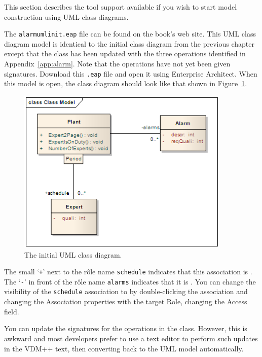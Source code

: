 This section describes the tool support available if you wish to start
model construction using UML class diagrams. 

The \texttt{alarmumlinit.eap} file can be found on the book's web
site. This UML class diagram model is identical to the initial class
diagram from the previous chapter 
except that the  class has been updated with the three
operations identified in Appendix~\ref{app:alarm}.
Note that the operations have not yet been given signatures. Download
this \texttt{.eap} file and open it using Enterprise Architect. When
this model is open, the class diagram should look like that shown in 
Figure~\ref{fig:initialuml}.

\begin{figure}[htbp]
\begin{center}
\includegraphics[width=4in]{figures/initialumloverture}
\caption{The initial UML class diagram.\label{fig:initialuml}}
\end{center}
\end{figure}

The small `\texttt{+}' next to the r\^{o}le name \texttt{schedule}
indicates that this association is . The `\texttt{-}' in
front of the r\^{o}le name \texttt{alarms} indicates that it is
. You can change the visibility of the
\texttt{schedule} association to  by double-clicking the
association and changing the \textsf{Association properties} with the
\textsf{target Role}, changing the \textsf{Access} field.

You can update the signatures for the operations in the
 class. However, this is awkward and most developers
prefer to use a text editor to perform such updates in the VDM++ text, then converting back to the 
UML model automatically.

